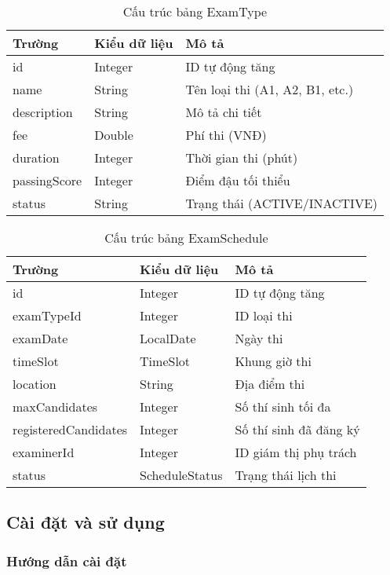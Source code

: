 \documentclass[12pt,a4paper]{article}
\begin{document}
\begin{table}[H]
\centering
\caption{Cấu trúc bảng ExamType}
\label{tab:examtype_structure}
\begin{tabular}{|l|l|l|}
\hline
\textbf{Trường} & \textbf{Kiểu dữ liệu} & \textbf{Mô tả} \\
\hline
id & Integer & ID tự động tăng \\
\hline
name & String & Tên loại thi (A1, A2, B1, etc.) \\
\hline
description & String & Mô tả chi tiết \\
\hline
fee & Double & Phí thi (VNĐ) \\
\hline
duration & Integer & Thời gian thi (phút) \\
\hline
passingScore & Integer & Điểm đậu tối thiểu \\
\hline
status & String & Trạng thái (ACTIVE/INACTIVE) \\
\hline
\end{tabular}
\end{table}

\begin{table}[H]
\centering
\caption{Cấu trúc bảng ExamSchedule}
\label{tab:examschedule_structure}
\begin{tabular}{|l|l|l|}
\hline
\textbf{Trường} & \textbf{Kiểu dữ liệu} & \textbf{Mô tả} \\
\hline
id & Integer & ID tự động tăng \\
\hline
examTypeId & Integer & ID loại thi \\
\hline
examDate & LocalDate & Ngày thi \\
\hline
timeSlot & TimeSlot & Khung giờ thi \\
\hline
location & String & Địa điểm thi \\
\hline
maxCandidates & Integer & Số thí sinh tối đa \\
\hline
registeredCandidates & Integer & Số thí sinh đã đăng ký \\
\hline
examinerId & Integer & ID giám thị phụ trách \\
\hline
status & ScheduleStatus & Trạng thái lịch thi \\
\hline
\end{tabular}
\end{table}

\subsection{Cài đặt và sử dụng}

\subsubsection{Hướng dẫn cài đặt}
\end{document}
